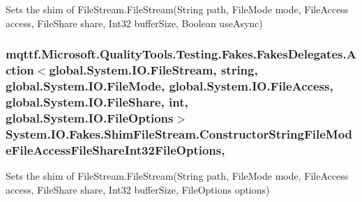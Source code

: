 Sets the shim of File\-Stream.\-File\-Stream(\-String path, File\-Mode mode, File\-Access access, File\-Share share, Int32 buffer\-Size, Boolean use\-Async)

\hypertarget{class_system_1_1_i_o_1_1_fakes_1_1_shim_file_stream_a2561e5fb8340c0dc01d227b3c2f57131}{
\subsubsection[{Constructor\-String\-File\-Mode\-File\-Access\-File\-Share\-Int32\-File\-Options}]{\setlength{\rightskip}{0pt plus 5cm}mqttf.\-Microsoft.\-Quality\-Tools.\-Testing.\-Fakes.\-Fakes\-Delegates.\-Action$<$global.\-System.\-I\-O.\-File\-Stream, string, global.\-System.\-I\-O.\-File\-Mode, global.\-System.\-I\-O.\-File\-Access, global.\-System.\-I\-O.\-File\-Share, int, global.\-System.\-I\-O.\-File\-Options$>$ System.\-I\-O.\-Fakes.\-Shim\-File\-Stream.\-Constructor\-String\-File\-Mode\-File\-Access\-File\-Share\-Int32\-File\-Options\hspace{0.3cm}{\ttfamily [static]}, {\ttfamily [set]}}}\label{class_system_1_1_i_o_1_1_fakes_1_1_shim_file_stream_a2561e5fb8340c0dc01d227b3c2f57131}


Sets the shim of File\-Stream.\-File\-Stream(\-String path, File\-Mode mode, File\-Access access, File\-Share share, Int32 buffer\-Size, File\-Options options)

